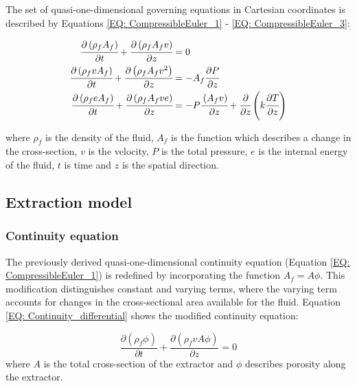 \documentclass[a4paper,fleqn]{cas-dc}
\begin{document}
The set of quasi-one-dimensional governing equations in Cartesian coordinates is described by Equations \ref{EQ: CompressibleEuler_1} - \ref{EQ: CompressibleEuler_3}:

{\footnotesize
	\begin{align}
		\label{EQ: CompressibleEuler_1}
		\cfrac{\partial \left( \rho_f A_f \right) }{\partial t} + \cfrac{\partial \left( \rho_f A_f v \right)}{\partial z} &= 0 \\
		\cfrac{\partial \left( \rho_f v A_f \right) }{\partial t} + \cfrac{\partial \left( \rho_f A_f v^2 \right)}{\partial z} &= -A_f \cfrac{\partial P}{\partial z} \label{EQ: CompressibleEuler_2} \\
		\cfrac{\partial \left( \rho_f e A_f \right) }{\partial t} + \cfrac{\partial \left( \rho_f A_f v e\right)}{\partial z} &= -P\cfrac{\left( A_f v \right)}{\partial z} + \cfrac{\partial}{\partial z} \left( k \cfrac{\partial T}{\partial z} \right)   
		\label{EQ: CompressibleEuler_3}
	\end{align}  
}

where $\rho_f$ is the density of the fluid, $A_f$ is the function which describes a change in the cross-section, $v$ is the velocity, $P$ is the total pressure, $e$ is the internal energy of the fluid, $t$ is time and $z$ is the spatial direction.

\subsection{Extraction model} \label{CH: Extraction_model}
\subsubsection{Continuity equation} \label{CH: Continuity}

The previously derived quasi-one-dimensional continuity equation (Equation \ref{EQ: CompressibleEuler_1}) is redefined by incorporating the function $A_f = A\phi$. This modification distinguishes constant and varying terms, where the varying term accounts for changes in the cross-sectional area available for the fluid. Equation \ref{EQ: Continuity_differential} shows the modified continuity equation:

{\footnotesize
	\begin{equation} \label{EQ: Continuity_differential}
		\frac{\partial (\rho_f \phi)}{\partial t} + \frac{\partial (\rho_f v A\phi)}{\partial z} = 0
	\end{equation}
}
where $A$ is the total cross-section of the extractor and $\phi$ describes porosity along the extractor.
\end{document}
